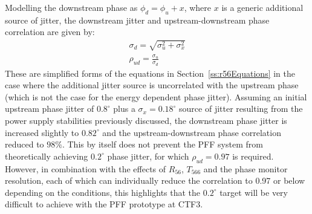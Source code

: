 Modelling the downstream phase as \(\phi_d = \phi_u + x\), where \(x\) is a generic additional source of jitter, the downstream jitter and upstream-downstream phase correlation are given by:
\begin{eqnarray}
\sigma_d = \sqrt{\sigma_u^2 + \sigma_x^2} \\
\rho_{ud} = \frac{\sigma_u}{\sigma_d}
\end{eqnarray}
These are simplified forms of the equations in Section~\ref{ss:r56Equations} in the case where the additional jitter source is uncorrelated with the upstream phase (which is not the case for the energy dependent phase jitter). Assuming an initial upstream phase jitter of \(0.8^\circ\) plus a \(\sigma_x = 0.18^\circ\) source of jitter resulting from the power supply stabilities previously discussed, the downstream phase jitter is increased slightly to \(0.82^\circ\) and the upstream-downstream phase correlation reduced to \(98\%\). This by itself does not prevent the PFF system from theoretically achieving \(0.2^\circ\) phase jitter, for which \(\rho_{ud} = 0.97\) is required. However, in combination with the effects of \(R_{56}\), \(T_{566}\) and the phase monitor resolution, each of which can individually reduce the correlation to 0.97 or below depending on the conditions, this highlights that the \(0.2^\circ\) target will be very difficult to achieve with the PFF prototype at CTF3.
